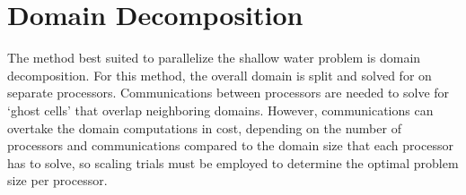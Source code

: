 \documentclass{article}
\begin{document}
\section*{Domain Decomposition}
The method best suited to parallelize the shallow water problem is domain decomposition. For this method, the overall domain is split and solved for on separate processors. Communications between processors are needed to solve for `ghost cells' that overlap neighboring domains. However, communications can overtake the domain computations in cost, depending on the number of processors and communications compared to the domain size that each processor has to solve, so scaling trials must be employed to determine the optimal problem size per processor.
\end{document}
